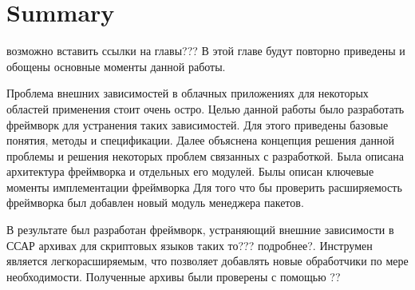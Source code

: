 
\chapter{Summary}\label{chap:zusfas}

возможно вставить ссылки на главы???
В этой главе будут повторно приведены и обощены основные моменты данной работы.

Проблема внешних зависимостей в облачных приложениях для некоторых областей применения стоит очень остро.
Целью данной работы было разработать фреймворк для устранения таких зависимостей.
Для этого приведены базовые понятия, методы и спецификации.
Далее объяснена концепция решения данной проблемы и решения некоторых проблем связанных с разработкой.
Была описана архитектура фреймворка и отдельных его модулей.
Былы описан ключевые моменты имплементации фреймворка
Для того что бы проверить расширяемость фреймворка был добавлен новый модуль менеджера пакетов.

В результате был разработан фреймворк, устраняющий внешние зависимости в ССАР архивах для скриптовых языков таких то??? подробнее?.
Инструмен является легкорасширяемым, что позволяет добавлять новые обработчики по мере необходимости.
Полученные архивы были проверены с помощью ??

\fi